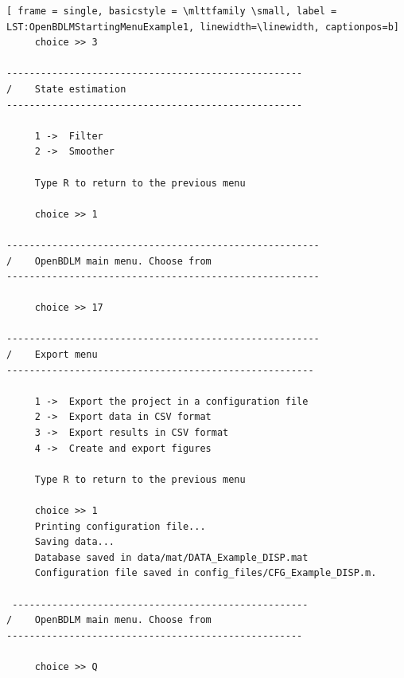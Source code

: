 \documentclass[11pt,twoside]{article}
\begin{document}
\begin{lstlisting}[ frame = single, basicstyle = \mlttfamily \small, label = LST:OpenBDLMStartingMenuExample1, linewidth=\linewidth, captionpos=b]
     choice >> 3

----------------------------------------------------
/    State estimation
----------------------------------------------------

     1 ->  Filter 
     2 ->  Smoother 

     Type R to return to the previous menu 

     choice >> 1

-------------------------------------------------------
/    OpenBDLM main menu. Choose from 
------------------------------------------------------- 

     choice >> 17

-------------------------------------------------------
/    Export menu
------------------------------------------------------

     1 ->  Export the project in a configuration file
     2 ->  Export data in CSV format
     3 ->  Export results in CSV format
     4 ->  Create and export figures 

     Type R to return to the previous menu

     choice >> 1
     Printing configuration file...
     Saving data...
     Database saved in data/mat/DATA_Example_DISP.mat
     Configuration file saved in config_files/CFG_Example_DISP.m.
     
 ----------------------------------------------------
/    OpenBDLM main menu. Choose from 
---------------------------------------------------- 

     choice >> Q  
     
\end{lstlisting}


%
\end{document}
